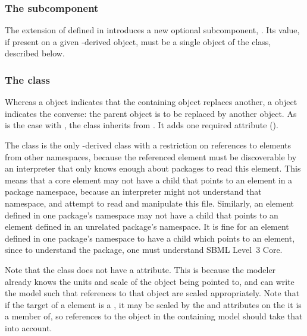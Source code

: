 \subsubsection{The \fixttspace{} subcomponent}

The extension of \SBase defined in  introduces a new optional subcomponent, .  Its value, if present on a given \SBase-derived object, must be a single object of the \ReplacedBy class, described below.


\subsubsection{The  class}
\label{replacedby-class}

Whereas a \ReplacedElement object indicates that the containing object replaces another, a \ReplacedBy object indicates the converse: the parent object is to be replaced by another object.  As is the case with \ReplacedElement, the \ReplacedBy class inherits from \SBaseRef.  It adds one required attribute ().

The \ReplacedBy class is the only \SBaseRef-derived class with a restriction on references to elements from other namespaces, because the referenced element must be discoverable by an interpreter that only knows enough about packages to read this element.  This means that a core element may not have a \ReplacedBy child that points to an element in a package namespace, because an interpreter might not understand that namespace, and attempt to read and manipulate this file.  Similarly, an element defined in one package's namespace may not have a \ReplacedBy child that points to an element defined in an unrelated package's namespace.  It is fine for an element defined in one package's namespace to have a \ReplacedBy child which points to an \sbmlthreecore element, since to understand the package, one must understand SBML Level~3 Core.

Note that the \ReplacedBy class does not have a  attribute.  This is because the modeler already knows the units and scale of the object being pointed to, and can write the model such that  references to that object are scaled appropriately.  Note that if the target of a \ReplacedBy element is a \Reaction, it may be scaled by the  and  attributes on the \Submodel it is a member of, so references to the object in the containing model should take that into account.

